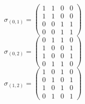 \documentclass[8pt]{article}\usepackage{amsmath}
\begin{document}
 \[ \sigma_{(0, 1)}= \left(\begin{array}{rrrr}
1 & 1 & 0 & 0 \\
1 & 1 & 0 & 0 \\
0 & 0 & 1 & 1 \\
0 & 0 & 1 & 1
\end{array}\right)  \]
 \[ \sigma_{(0, 2)}= \left(\begin{array}{rrrr}
0 & 1 & 1 & 0 \\
1 & 0 & 0 & 1 \\
1 & 0 & 0 & 1 \\
0 & 1 & 1 & 0
\end{array}\right)  \]
 \[ \sigma_{(1, 2)}= \left(\begin{array}{rrrr}
1 & 0 & 1 & 0 \\
0 & 1 & 0 & 1 \\
1 & 0 & 1 & 0 \\
0 & 1 & 0 & 1
\end{array}\right)  \]
 
\end{document}

